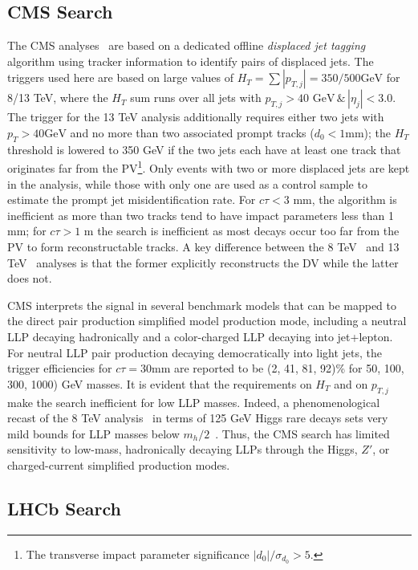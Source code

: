 \subsection{CMS Search}

The CMS analyses~\cite{Aad:2015rba,CMS:2017oor} are based on a dedicated offline \emph{displaced jet tagging} algorithm using tracker information to identify pairs of displaced jets. The triggers used here are based on large values of $H_T =  \sum | p_{T,j}|=350/500\mbox{GeV}$ for 8/13 TeV, where the $H_T$ sum runs over all jets with $p_{T,j}> 40 \mbox{ GeV}\,\&\, |\eta_j| < 3.0$. The trigger for the 13 TeV analysis  additionally requires either two jets with $p_T>40\mbox{GeV}$ and no more than two associated prompt tracks ($d_0<1\mbox{mm}$); the $H_T$ threshold is lowered to 350 GeV if the two jets each have at least one track that originates far from the PV\footnote{The transverse impact parameter significance $|d_0|/\sigma_{d_0}>5$.}. Only events with two or more displaced jets are kept in the analysis, while those with only one are used as a control sample to estimate the prompt jet misidentification rate. For $c \tau < 3$ mm, the algorithm is inefficient as more than two tracks tend to have impact parameters less than 1 mm; for $c \tau > 1$ m the search is inefficient as most decays occur too far from the PV to form reconstructable tracks.  A key difference between the 8 TeV~\cite{Khachatryan:2015wka} and 13 TeV~\cite{CMS:2017oor} analyses is that the former explicitly reconstructs the DV while the latter does not. 

CMS interprets the signal in several benchmark models that can be mapped to the direct pair production simplified model production mode, including a neutral LLP decaying hadronically and a color-charged LLP decaying into jet+lepton. For neutral LLP pair production decaying democratically into light jets, the trigger efficiencies for $c \tau= 30 $mm are reported to be (2, 41, 81, 92)\% for 50, 100, 300, 1000) GeV masses. It is evident that the requirements on $H_T$ and on $p_{T,j}$ make the search inefficient for low LLP masses. Indeed, a phenomenological recast of the 8 TeV analysis~\cite{CMS:2014wda} in terms of 125 GeV Higgs rare decays sets very mild bounds for LLP masses below $m_h / 2$~\cite{Csaki:2015fba}. Thus, the CMS search has limited sensitivity to low-mass, hadronically decaying LLPs through the Higgs, $Z'$, or charged-current simplified production modes.

\subsection{LHCb Search}

